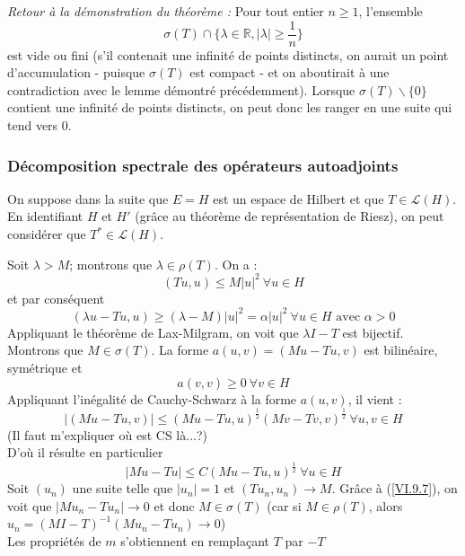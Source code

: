 \begin{dem}
\begin{enumerate}
\bigskip
\textit{Retour à la démonstration du théorème :} Pour tout entier $n\geq 1$, l'ensemble \[\sigma(T)\cap\{\lambda\in\mathbb{R}, |\lambda|\geq\frac{1}{n}\}\]
est vide ou fini (s'il contenait une infinité de points distincts, on aurait un point d'accumulation - puisque $\sigma(T)$ est compact - et on aboutirait à une contradiction avec le lemme démontré précédemment). Lorsque $\sigma(T)\backslash\{0\}$ contient une infinité de points distincts, on peut donc les ranger en une suite qui tend vers $0$.
\end{enumerate}
\end{dem}

\subsubsection{Décomposition spectrale des opérateurs autoadjoints}
On suppose dans la suite que $E=H$ est un espace de Hilbert et que $T\in\mathscr{L}(H)$. En identifiant $H$ et $H'$ (grâce au théorème de représentation de Riesz), on peut considérer que $T^*\in\mathscr{L}(H)$.



\begin{dem}
Soit $\lambda>M$; montrons que $\lambda\in\rho(T)$. On a : \[(Tu,u)\leq M|u|^2\ \forall u\in H\]
et par conséquent \[(\lambda u-Tu,u)\geq (\lambda-M)|u|^2=\alpha|u|^2\ \forall u\in H \text{ avec } \alpha>0\]
Appliquant le théorème de Lax-Milgram, on voit que $\lambda I-T$ est bijectif.\\
Montrons que $M\in\sigma(T)$. La forme $a(u,v)=(Mu-Tu,v)$ est bilinéaire, symétrique et \[a(v,v)\geq 0\ \forall v\in H\]
Appliquant l'inégalité de Cauchy-Schwarz à la forme $a(u,v)$, il vient : \[|(Mu-Tu,v)|\leq (Mu-Tu,u)^{\frac{1}{2}}(Mv-Tv,v)^\frac{1}{2}\ \forall u,v\in H\] (Il faut m'expliquer où est CS là...?)\\
D'où il résulte en particulier \begin{equation}\label{VI.9.7} |Mu-Tu|\leq C(Mu-Tu,u)^\frac{1}{2}\ \forall u\in H \end{equation}
Soit $(u_n)$ une suite telle que $|u_n|=1$ et $(Tu_n,u_n)\to M$. Grâce à (\ref{VI.9.7}), on voit que $|Mu_n-Tu_n|\to 0$ et donc $M\in\sigma(T)$ (car si $M\in\rho(T)$, alors $u_n=(MI-T)^{-1}(Mu_n-Tu_n)\to 0$)\\
Les propriétés de $m$ s'obtiennent en remplaçant $T$ par $-T$
\end{dem}

